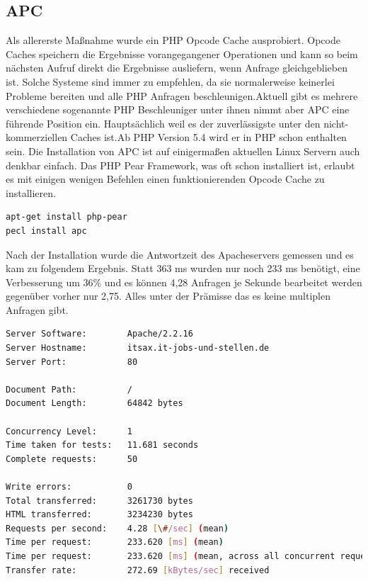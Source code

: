 \subsection{APC} Als allererste Maßnahme wurde ein PHP Opcode Cache ausprobiert. Opcode Caches speichern die Ergebnisse vorangegangener Operationen und kann so beim nächsten Aufruf direkt die Ergebnisse ausliefern, wenn Anfrage gleichgeblieben ist. Solche Systeme sind immer zu empfehlen, da sie normalerweise keinerlei Probleme bereiten und alle PHP Anfragen beschleunigen.Aktuell gibt es mehrere verschiedene sogenannte PHP Beschleuniger unter ihnen nimmt aber APC eine führende Position ein. Hauptsächlich weil es der zuverlässigste unter den nicht-kommerziellen Caches ist.Ab PHP Version 5.4 wird er in PHP schon enthalten sein. Die Installation von APC ist auf einigermaßen aktuellen Linux Servern auch denkbar einfach. Das PHP Pear Framework, was oft schon installiert ist, erlaubt es mit einigen wenigen Befehlen einen funktionierenden Opcode Cache zu installieren. 
\begin{lstlisting}[language=bash,label=Installation von APC,caption=Installation von APC]
apt-get install php-pear
pecl install apc
\end{lstlisting}
Nach der Installation wurde die Antwortzeit des Apacheservers gemessen und es kam zu folgendem Ergebnis. Statt 363 ms wurden nur noch 233 ms benötigt, eine Verbesserung um 36\% und es können 4,28 Anfragen je Sekunde bearbeitet werden gegenüber vorher nur 2,75. Alles unter der Prämisse das es keine multiplen Anfragen gibt. 
\begin{lstlisting}[language=bash,label=Ausgabe von ab,caption=Ausgabe von ab]
Server Software:        Apache/2.2.16
Server Hostname:        itsax.it-jobs-und-stellen.de
Server Port:            80

Document Path:          /
Document Length:        64842 bytes

Concurrency Level:      1
Time taken for tests:   11.681 seconds
Complete requests:      50

Write errors:           0
Total transferred:      3261730 bytes
HTML transferred:       3234230 bytes
Requests per second:    4.28 [\#/sec] (mean)
Time per request:       233.620 [ms] (mean)
Time per request:       233.620 [ms] (mean, across all concurrent requests)
Transfer rate:          272.69 [kBytes/sec] received
\end{lstlisting}

